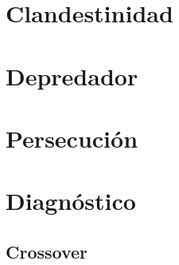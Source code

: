\documentclass[11pt]{book}
\begin{document}
\chapter{Clandestinidad}\label{chapter:clandestinidad}


\chapter{Depredador}\label{chapter:depredador}


\chapter{Persecución}\label{chapter:persecucion}


\chapter{Diagnóstico}\label{chapter:diagnostico}


\begin{appendices}
\renewcommand{\thechapter}{\arabic{chapter}}
\chapter{Crossover}\label{appendix:crossover}

\end{appendices}
\end{document}
